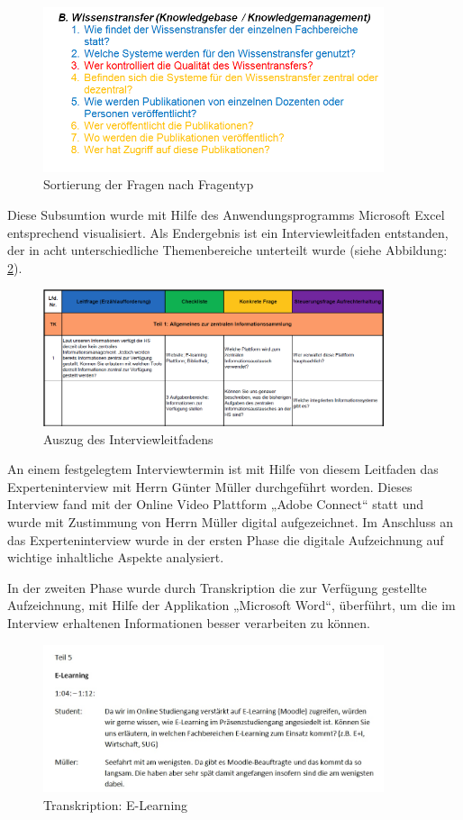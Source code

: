 \begin{figure}[h!]
	\centering
	\includegraphics[width=10cm]{kapitel/gruppe2/bilder/sortierung_fragentyp}
	\caption{Sortierung der Fragen nach Fragentyp}
	\label{fig_sortierung_fragentyp}
\end{figure}

Diese Subsumtion wurde mit Hilfe des Anwendungsprogramms Microsoft Excel entsprechend visualisiert. Als Endergebnis ist ein Interviewleitfaden entstanden, der in acht unterschiedliche Themenbereiche unterteilt wurde  (siehe Abbildung: \ref{fig_auszug_interviewleitfaden}).

\begin{figure}[h!]
	\centering
	\includegraphics[width=10cm]{kapitel/gruppe2/bilder/auszug_leitfaden}
	\caption{Auszug des Interviewleitfadens}
	\label{fig_auszug_interviewleitfaden}
\end{figure}

An einem festgelegtem Interviewtermin ist mit Hilfe von diesem Leitfaden das Experteninterview mit Herrn Günter Müller durchgeführt worden. Dieses Interview fand mit der Online Video Plattform „Adobe Connect“ statt und wurde mit Zustimmung von Herrn Müller digital aufgezeichnet. Im Anschluss an das Experteninterview wurde in der ersten Phase die digitale Aufzeichnung auf wichtige inhaltliche Aspekte analysiert. 

In der zweiten Phase wurde durch Transkription die zur Verfügung gestellte Aufzeichnung, mit Hilfe der Applikation „Microsoft Word“, überführt, um die im Interview erhaltenen Informationen besser verarbeiten zu können.

\begin{figure}[h!]
	\centering
	\includegraphics[width=10cm]{kapitel/gruppe2/bilder/E-Learning_Transkription}
	\caption{Transkription: E-Learning}
	\label{fig_E-Learning_Transkription}
\end{figure}

